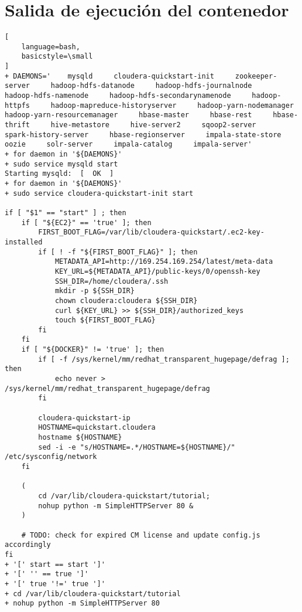\documentclass[a4paper]{article}
\begin{document}
\section{Salida de ejecución del contenedor}
\begin{lstlisting}[
    language=bash,
    basicstyle=\small
]
+ DAEMONS='    mysqld     cloudera-quickstart-init     zookeeper-server     hadoop-hdfs-datanode     hadoop-hdfs-journalnode     hadoop-hdfs-namenode     hadoop-hdfs-secondarynamenode     hadoop-httpfs     hadoop-mapreduce-historyserver     hadoop-yarn-nodemanager     hadoop-yarn-resourcemanager     hbase-master     hbase-rest     hbase-thrift     hive-metastore     hive-server2     sqoop2-server     spark-history-server     hbase-regionserver     impala-state-store     oozie     solr-server     impala-catalog     impala-server'
+ for daemon in '${DAEMONS}'
+ sudo service mysqld start
Starting mysqld:  [  OK  ]
+ for daemon in '${DAEMONS}'
+ sudo service cloudera-quickstart-init start

if [ "$1" == "start" ] ; then
    if [ "${EC2}" == 'true' ]; then
        FIRST_BOOT_FLAG=/var/lib/cloudera-quickstart/.ec2-key-installed
        if [ ! -f "${FIRST_BOOT_FLAG}" ]; then
            METADATA_API=http://169.254.169.254/latest/meta-data
            KEY_URL=${METADATA_API}/public-keys/0/openssh-key
            SSH_DIR=/home/cloudera/.ssh
            mkdir -p ${SSH_DIR}
            chown cloudera:cloudera ${SSH_DIR}
            curl ${KEY_URL} >> ${SSH_DIR}/authorized_keys
            touch ${FIRST_BOOT_FLAG}
        fi
    fi
    if [ "${DOCKER}" != 'true' ]; then
        if [ -f /sys/kernel/mm/redhat_transparent_hugepage/defrag ]; then
            echo never > /sys/kernel/mm/redhat_transparent_hugepage/defrag
        fi

        cloudera-quickstart-ip
        HOSTNAME=quickstart.cloudera
        hostname ${HOSTNAME}
        sed -i -e "s/HOSTNAME=.*/HOSTNAME=${HOSTNAME}/" /etc/sysconfig/network
    fi

    (
        cd /var/lib/cloudera-quickstart/tutorial;
        nohup python -m SimpleHTTPServer 80 &
    )

    # TODO: check for expired CM license and update config.js accordingly
fi
+ '[' start == start ']'
+ '[' '' == true ']'
+ '[' true '!=' true ']'
+ cd /var/lib/cloudera-quickstart/tutorial
+ nohup python -m SimpleHTTPServer 80


\end{lstlisting}
\end{document}
